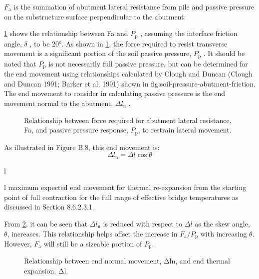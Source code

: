 $F_\text{a}$ is the summation of abutment lateral resistance from pile and passive pressure on the substructure surface perpendicular to the abutment.

\cref{fig:pp-vs-fa} shows the relationship between Fa and $P_\text{p}$ , assuming the interface friction angle, $\delta$ , to be \ang{20}. As shown in \cref{fig:pp-vs-fa}, the force required to resist transverse movement is a significant portion of the soil passive pressure, $P_\text{p}$ . It should be noted that $P_\text{p}$ is not necessarily full passive pressure, but can be determined for the end movement using relationships calculated by Clough and Duncan (Clough and Duncan 1991; Barker et al. 1991) shown in {fig:soil-pressure-abutment-friction}. The end movement to consider in calculating passive pressure is the end movement normal to the abutment, $\Delta l_\text{n}$ .


\begin{figure}
  \caption{Relationship between force required for abutment lateral resistance, Fa, and passive pressure response, $P_\text{p}$, to restrain lateral movement.}
  \label{fig:pp-vs-fa}
\end{figure}

As illustrated in Figure B.8, this end movement is:
\begin{equation}
  \Delta l_\text{n} =  \Delta l \cos\theta
\end{equation}
\begin{EqDesc}{\Delta l}
  \item[\Delta l] maximum expected end movement for thermal re-expansion from the starting point of full contraction for the full range of effective bridge temperatures as discussed in Section 8.6.2.3.1.
\end{EqDesc}


From \cref{fig:delataln-delatal}, it can be seen that $\Delta l_\text{n}$ is reduced with respect to $\Delta l$ as the skew angle, $\theta$, increases. This relationship helps offset the increase in $F_\text{a}/P_\text{p}$ with increasing $\theta$. However, $F_\text{a}$ will still be a sizeable portion of $P_\text{p}$.

\begin{figure}
  \caption{Relationship between end normal movement, Δln, and end thermal expansion, Δl.}
  \label{fig:delataln-delatal}
\end{figure}

